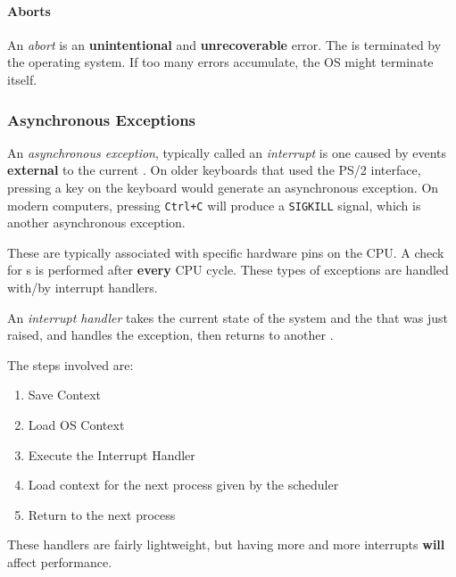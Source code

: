 \paragraph{Aborts}\label{par:Aborts}
\begin{definition}[Abort]\label{def:Abort}
  An \emph{abort} is an \textbf{unintentional} and \textbf{unrecoverable} error.
  The  is terminated by the operating system.
  If too many errors accumulate, the OS might terminate itself.
\end{definition}

\subsubsection{Asynchronous Exceptions}\label{subsubsec:Asynchronous_Exceptions}
\begin{definition}\label{def:Asynchronous_Exception}
  An \emph{asynchronous exception}, typically called an \emph{interrupt} is one caused by events \textbf{external} to the current .
  On older keyboards that used the PS/2 interface, pressing a key on the keyboard would generate an asynchronous exception.
  On modern computers, pressing \texttt{Ctrl+C} will produce a \texttt{SIGKILL} signal, which is another asynchronous exception.
\end{definition}

These are typically associated with specific hardware pins on the CPU.\@
A check for s is performed after \textbf{every} CPU cycle.
These types of exceptions are handled with/by interrupt handlers.

\begin{definition}\label{def:Interrupt_Handler}
  An \emph{interrupt handler} takes the current state of the system and the  that was just raised, and handles the exception, then returns to another .

  The steps involved are:
  \begin{enumerate}[noitemsep]
  \item Save Context
  \item Load OS Context
  \item Execute the Interrupt Handler
  \item Load context for the next process given by the scheduler
  \item Return to the next process
  \end{enumerate}

  \begin{remark}
    These handlers are fairly lightweight, but having more and more interrupts \textbf{will} affect performance.
  \end{remark}
\end{definition}

